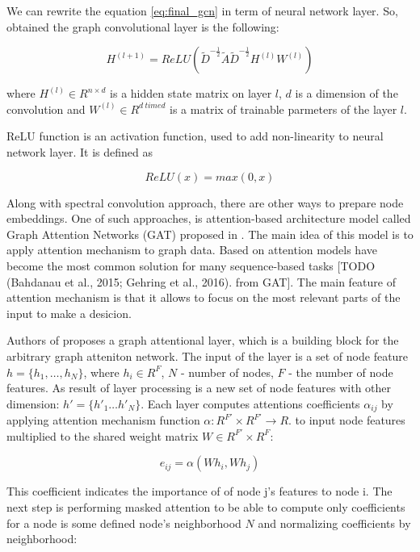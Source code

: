 We can rewrite the equation \ref{eq:final_gcn} in term of neural network layer. So, obtained the graph convolutional layer 
is the following:

\begin{equation}
    H^{(l+1)} = ReLU(\tilde{D}^{-\frac{1}{2}}\tilde{A}\tilde{D}^{-\frac{1}{2}}H^{(l)}W^{(l)})
    \label{eq:final_gcn_nn}
\end{equation}

where $H^{(l)} \in R^{n \times d}$ is a hidden state matrix on layer $l$, $d$ is a dimension
of the convolution and $W^{(l)} \in R^{d \ time d}$ is a matrix of trainable parmeters of the layer $l$.

ReLU function is an activation function, used to add non-linearity to neural network layer. It is defined as

\begin{equation}
    ReLU(x) = max(0,x)
    \label{eq:relu}
\end{equation}


Along with spectral convolution approach, there are other ways to prepare node embeddings. One of such approaches, is 
attention-based architecture model called Graph Attention Networks (GAT) proposed in \cite{GAT}.
The main idea of this model is to apply attention mechanism to graph data. Based on attention models have become 
the most common solution for many sequence-based tasks [TODO (Bahdanau et al., 2015; Gehring et al., 2016). from GAT].
The main feature of attention mechanism is that it allows to focus on the most relevant parts of the input 
to make a desicion.

Authors of \cite{GAT} proposes a graph attentional layer, which is a building block for the arbitrary graph atteniton network.
The input of the layer is a set of node feature $ h=\{ h_1,\dots , h_N \}$, where $h_i \in R^F$, $N$ - number of nodes, $F$ - the number
of node features. As result of layer processing is a new set of node features with other dimension: $h' = \{ h'_1 \dots h'_N \}$.
Each layer computes attentions coefficients $\alpha_{ij}$ by applying attention mechanism function $\alpha : R^{F'} \times R^{F'} \rightarrow R$.
to input node features multiplied to the shared weight matrix $W \in R^{F'} \times R^{F}$:

\begin{equation}
    e_{ij} = \alpha(Wh_i, Wh_j)
    \label{eq:att_coeff}
\end{equation}

This coefficient indicates the importance of of node j's features to node i. The next step is performing masked attention to 
be able to compute only coefficients for a node is some defined node's neighborhood $N$ and normalizing coefficients by neighborhood:


